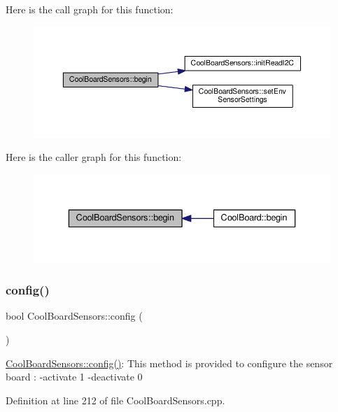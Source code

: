 Here is the call graph for this function\+:\nopagebreak
\begin{figure}[H]
\begin{center}
\leavevmode
\includegraphics[width=350pt]{class_cool_board_sensors_a97095823ef7c8f5290812f1405b966b3_cgraph}
\end{center}
\end{figure}
Here is the caller graph for this function\+:\nopagebreak
\begin{figure}[H]
\begin{center}
\leavevmode
\includegraphics[width=336pt]{class_cool_board_sensors_a97095823ef7c8f5290812f1405b966b3_icgraph}
\end{center}
\end{figure}
\mbox{\label{class_cool_board_sensors_a9a218895c5423375c33c08f2c56fb23a}} 
\subsubsection{\texorpdfstring{config()}{config()}}
{\footnotesize\ttfamily bool Cool\+Board\+Sensors\+::config (\begin{DoxyParamCaption}{ }\end{DoxyParamCaption})}

\hyperlink{class_cool_board_sensors_a9a218895c5423375c33c08f2c56fb23a}{Cool\+Board\+Sensors\+::config()}\+: This method is provided to configure the sensor board \+: -\/activate 1 -\/deactivate 0 

Definition at line 212 of file Cool\+Board\+Sensors.\+cpp.

